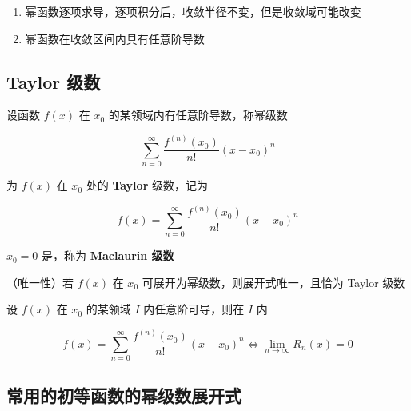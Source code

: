 \documentclass[lang = zh , final , oneside , openany , titlepage , zihao = -4 , linespread = 1.3 , baselineskip = false , cjk-font = windows , text-font = newtx , math-font = newtx , math-style = TeX]{sjtureport}
\begin{document}
\begin{remark}
    \begin{enumerate}
\item
  幂函数逐项求导，逐项积分后，收敛半径不变，但是收敛域可能改变
\item
  幂函数在收敛区间内具有任意阶导数
\end{enumerate}
\end{remark}

\subsection{Taylor 级数}

\begin{definition}
    设函数 \(f(x)\) 在 \(x_0\) 的某领域内有任意阶导数，称幂级数

\[\sum_{n=0}^\infty \frac{f^{(n)}(x_0)}{n!}(x-x_0)^n\]

为 \(f(x)\) 在 \(x_0\) 处的 \textbf{Taylor} 级数，记为

\[f(x) = \sum_{n=0}^\infty \frac{f^{(n)}(x_0)}{n!}(x-x_0)^n\]

\(x_0=0\) 是，称为 \textbf{Maclaurin 级数}
\end{definition}

\begin{theorem}
    （唯一性）若 \(f(x)\) 在 \(x_0\) 可展开为幂级数，则展开式唯一，且恰为 Taylor 级数
\end{theorem}

\begin{theorem}
    设 \(f(x)\) 在 \(x_0\) 的某领域 \(I\) 内任意阶可导，则在 \(I\) 内

\[f(x) = \sum_{n=0}^\infty \frac{f^{(n)}(x_0)}{n!}(x-x_0)^n \Leftrightarrow \lim_{n\to\infty}R_n(x) =0\]
\end{theorem}

\subsection{常用的初等函数的幂级数展开式}
\end{document}
